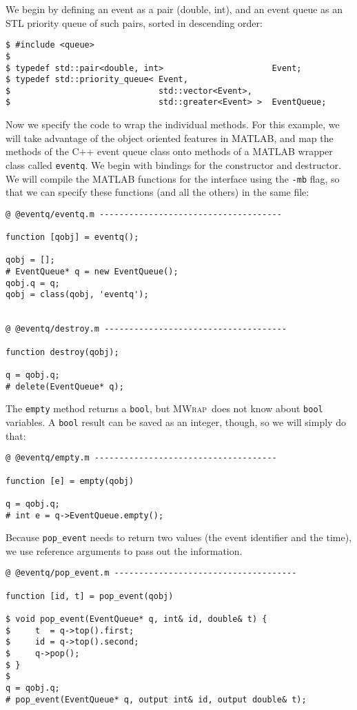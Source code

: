 \documentclass[12pt]{article}
\newcommand{\mwrap}{\textsc{MWrap}}
\begin{document}
We begin by defining an event as a pair (double, int), and an
event queue as an STL priority queue of such pairs, sorted in
descending order:
\begin{verbatim}
$ #include <queue>
$
$ typedef std::pair<double, int>                      Event;
$ typedef std::priority_queue< Event,
$                              std::vector<Event>,
$                              std::greater<Event> >  EventQueue;
\end{verbatim}

Now we specify the code to wrap the individual methods.  For this
example, we will take advantage of the object oriented features in
MATLAB, and map the methods of the C++ event queue class onto methods
of a MATLAB wrapper class called {\tt eventq}.  We begin with bindings
for the constructor and destructor.  We will compile the MATLAB
functions for the interface using the {\tt -mb} flag, so that we can
specify these functions (and all the others) in the same file:
\begin{verbatim}
@ @eventq/eventq.m -------------------------------------

function [qobj] = eventq();

qobj = [];
# EventQueue* q = new EventQueue();
qobj.q = q;
qobj = class(qobj, 'eventq');


@ @eventq/destroy.m -------------------------------------

function destroy(qobj);

q = qobj.q;
# delete(EventQueue* q);
\end{verbatim}

The {\tt empty} method returns a {\tt bool}, but \mwrap\ does not
know about {\tt bool} variables.  A {\tt bool} result can be saved
as an integer, though, so we will simply do that:
\begin{verbatim}
@ @eventq/empty.m -------------------------------------

function [e] = empty(qobj)

q = qobj.q;
# int e = q->EventQueue.empty();
\end{verbatim}

Because {\tt pop\_event} needs to return two values (the event identifier
and the time), we use reference arguments to pass out the information.
\begin{verbatim}
@ @eventq/pop_event.m -------------------------------------

function [id, t] = pop_event(qobj)

$ void pop_event(EventQueue* q, int& id, double& t) {
$     t  = q->top().first;
$     id = q->top().second;
$     q->pop();
$ }
$
q = qobj.q;
# pop_event(EventQueue* q, output int& id, output double& t);
\end{verbatim}
\end{document}
